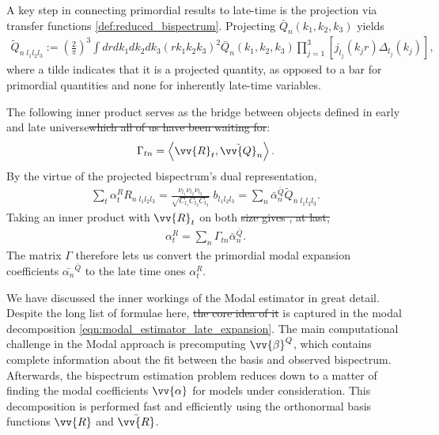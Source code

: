 \documentclass[a4paper,12pt,times,custombib,print,index]{Classes/PhDThesisPSnPDF} %
\providecommand{\DIFadd}[1]{{\protect\color{blue}\uwave{#1}}} %
\providecommand{\DIFdel}[1]{{\protect\color{red}\sout{#1}}}                      %
\providecommand{\DIFaddbegin}{} %
\providecommand{\DIFaddend}{} %
\providecommand{\DIFdelbegin}{} %
\providecommand{\DIFdelend}{} %
\newcommand{\DIFscaledelfig}{0.5}
\newlength{\DIFdelgraphicswidth} %
\newlength{\DIFdelgraphicsheight} %
\newcommand{\DIFaddincludegraphics}[2][]{{\color{blue}\fbox{\DIFOincludegraphics[#1]{#2}}}} %
\newcommand{\DIFdelincludegraphics}[2][]{%
\sbox{\DIFdelgraphicsbox}{\DIFOincludegraphics[#1]{#2}}%
\settoboxwidth{\DIFdelgraphicswidth}{\DIFdelgraphicsbox} %
\settoboxtotalheight{\DIFdelgraphicsheight}{\DIFdelgraphicsbox} %
\scalebox{\DIFscaledelfig}{%
\parbox[b]{\DIFdelgraphicswidth}{\usebox{\DIFdelgraphicsbox}\\[-\baselineskip] \rule{\DIFdelgraphicswidth}{0em}}\llap{\resizebox{\DIFdelgraphicswidth}{\DIFdelgraphicsheight}{%
\setlength{\unitlength}{\DIFdelgraphicswidth}%
\begin{picture}(1,1)%
\thicklines\linethickness{2pt} %
{\color[rgb]{1,0,0}\put(0,0){\framebox(1,1){}}}%
{\color[rgb]{1,0,0}\put(0,0){\line( 1,1){1}}}%
{\color[rgb]{1,0,0}\put(0,1){\line(1,-1){1}}}%
\end{picture}%
}\hspace*{3pt}}} %
} %
\DeclareRobustCommand{\DIFaddbegin}{\DIFOaddbegin \let\includegraphics\DIFaddincludegraphics} %
\DeclareRobustCommand{\DIFaddend}{\DIFOaddend \let\includegraphics\DIFOincludegraphics} %
\DeclareRobustCommand{\DIFdelbegin}{\DIFOdelbegin \let\includegraphics\DIFdelincludegraphics} %
\DeclareRobustCommand{\DIFdelend}{\DIFOaddend \let\includegraphics\DIFOincludegraphics} %
\begin{document}
A key step in connecting primordial results to late-time is the projection via transfer functions \eqref{def:reduced_bispectrum}. Projecting $\bar{Q}_n(k_1,k_2,k_3)$ yields
\begin{align}
	\tilde{Q}_{n \; l_1 l_2 l_3} := \left( \frac{2}{\pi} \right)^3 \int dr dk_1 dk_2 dk_3 \left(r k_1 k_2 k_3 \right)^2 \bar{Q}_n (k_1, k_2, k_3) \prod_{j=1}^{3} \left[ j_{l_j} (k_j r) \Delta_{l_j} (k_j) \right],
\end{align}
where a tilde indicates that it is a projected quantity, as opposed to a bar for primordial quantities and none for inherently late-time variables. 

The following inner product serves as the bridge between objects defined in \DIFaddbegin \DIFadd{the }\DIFaddend early and late universe\DIFdelbegin \DIFdel{which all of us have been waiting for}\DIFdelend :
\begin{align}
	\Gamma_{tn} = \left< \vv{R}_{t}, \tilde{\vv{Q}}_n \right>.
\end{align}
By the virtue of the projected bispectrum's dual representation,
\begin{align}
	\sum_t \alpha^R_t R_{n \; l_1 l_2 l_3} = \frac{\nu_{l_1} \nu_{l_2} \nu_{l_3}}{\sqrt{C_{l_1} C_{l_2} C_{l_3}}} \; b_{l_1 l_2 l_3} = \sum_n \bar{\alpha}^{\bar{Q}}_n \tilde{Q}_{n \; l_1 l_2 l_3}.
\end{align}
Taking an inner product with $\vv{R}_t$ on both \DIFdelbegin \DIFdel{size gives
, at last,
}\DIFdelend \DIFaddbegin \DIFadd{sides gives
}\DIFaddend \begin{align}
	\alpha^R_t = \sum_n \Gamma_{tn} \bar{\alpha}^{\bar{Q}}_n.
\end{align}
The matrix $\Gamma$ therefore lets us convert the primordial modal expansion coefficients $\bar{\alpha_n}^{\bar{Q}}$ to the late time ones $\alpha_t^{R}$.

\hspace{10pt}

We have discussed the inner workings of the Modal estimator in great detail. Despite the long list of formulae here, \DIFdelbegin \DIFdel{the core idea of it }\DIFdelend \DIFaddbegin \DIFadd{its core idea }\DIFaddend is captured in the modal decomposition \eqref{eqn:modal_estimator_late_expansion}. The main computational challenge in the Modal approach is precomputing $\vv{\beta}^Q$, which contains complete information about the fit between the basis and \DIFaddbegin \DIFadd{the }\DIFaddend observed bispectrum. Afterwards, the bispectrum estimation problem reduces down to a matter of finding the modal coefficients $\vv{\alpha}$ for models under consideration. This decomposition is performed fast and efficiently using the orthonormal basis functions $\vv{R}$ and $\bar{\vv{R}}$.
\end{document}
